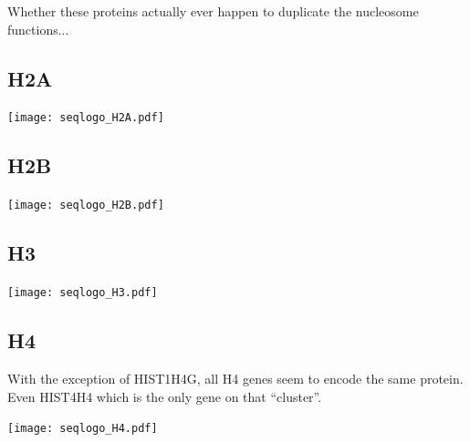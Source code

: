 \documentclass[10pt,a4paper,onecolumn,article]{memoir}
\begin{document}
      Whether these proteins actually ever happen to duplicate the nucleosome functions...


    \subsection{H2A}
      \begin{TableAndFigure*}
        \label{tab:H2A-consensus}
        

        \texttt{[image: seqlogo\_H2A.pdf]}
        \label{fig:H2A-weblogo}
      \end{TableAndFigure*}


    \subsection{H2B}
      \begin{TableAndFigure*}
        \label{tab:H2B-consensus}
        

        \texttt{[image: seqlogo\_H2B.pdf]}
        \label{fig:H2B-weblogo}
      \end{TableAndFigure*}

    \subsection{H3}
      \begin{TableAndFigure*}
        \label{tab:H3-consensus}
        

        \texttt{[image: seqlogo\_H3.pdf]}
        \label{fig:H3-weblogo}
      \end{TableAndFigure*}

    \subsection{H4}
      With the exception of HIST1H4G, all H4 genes seem to encode the same protein. Even HIST4H4 which is the
      only gene on that ``cluster''.
      \begin{TableAndFigure*}
        \label{tab:H4-consensus}
        

        \texttt{[image: seqlogo\_H4.pdf]}
        \label{fig:H4-weblogo}
      \end{TableAndFigure*}
\end{document}
